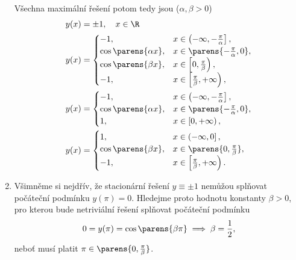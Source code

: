 \documentclass[answers]{exam}
\begin{document}
\begin{questions}
\begin{solution}
\begin{enumerate}[label=(\roman*)]
	  	Všechna maximální řešení potom tedy jsou ($\alpha, \beta > 0$)
	  	\begin{align*}
	  		y(x) &= \pm1, \quad x \in \R
	  		\\
	  		y(x) &=
	  		\begin{cases}
	  			-1, \quad &x \in \left( -\infty, -\frac{\pi}{\alpha} \right],
	  			\\
	  			\cos \parens{\alpha x}, &x \in \parens{-\frac{\pi}{\alpha}, 0},
	  			\\
	  			\cos \parens{\beta x}, &x \in \left[ 0, \frac{\pi}{\beta} \right),
	  			\\
	  			-1, \quad &x \in \left[\frac{\pi}{\beta}, +\infty \right),
	  		\end{cases}
	  		\\
	  		y(x) &=
	  		\begin{cases}
	  			-1, \quad &x \in \left( -\infty, -\frac{\pi}{\alpha} \right],
	  			\\
	  			\cos \parens{\alpha x}, &x \in \parens{-\frac{\pi}{\alpha}, 0},
	  			\\
	  			1, \quad &x \in \left[0, +\infty \right),
	  		\end{cases}	  		
	  		\\
	  		y(x) &=
	  		\begin{cases}
	  			1, \quad &x \in \left( -\infty, 0 \right],
	  			\\
	  			\cos \parens{\beta x}, &x \in \parens{0, \frac{\pi}{\beta}},
	  			\\
	  			- 1, \quad &x \in \left[\frac{\pi}{\beta}, +\infty \right).
	  		\end{cases}	 	  		
	  	\end{align*}
	  \item 
	  	Všimněme si nejdřív, že stacionární řešení $y \equiv \pm1$ nemůžou splňovat počáteční podmínku $y(\pi) = 0$. Hledejme proto hodnotu konstanty $\beta > 0$, pro kterou bude netriviální řešení splňovat počáteční podmínku
	  	\begin{equation*}
	  		0 = y(\pi) = \cos \parens{\beta \pi} \implies \beta = \frac{1}{2},
	  	\end{equation*}
	  	neboť musí platit $\pi \in \parens{0, \frac{\pi}{\beta}}$.
	  	

\end{enumerate}
\end{solution}
\end{questions}
\end{document}
